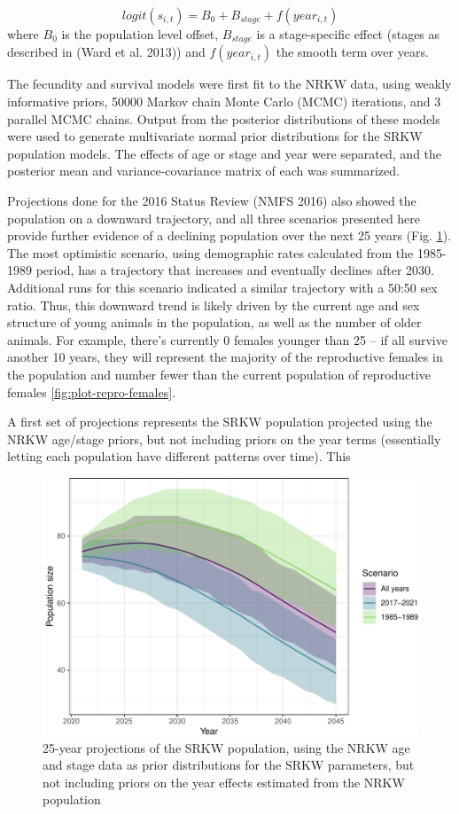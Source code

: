 \documentclass[]{article}
\begin{document}
\[logit(s_{i,t})=B_{0} + B_{stage} + f(year_{i,t})\] where \(B_{0}\) is
the population level offset, \(B_{stage}\) is a stage-specific effect
(stages as described in (Ward et al. 2013)) and \(f(year_{i,t})\) the
smooth term over years.

The fecundity and survival models were first fit to the NRKW data, using
weakly informative priors, 50000 Markov chain Monte Carlo (MCMC)
iterations, and 3 parallel MCMC chains. Output from the posterior
distributions of these models were used to generate multivariate normal
prior distributions for the SRKW population models. The effects of age
or stage and year were separated, and the posterior mean and
variance-covariance matrix of each was summarized.

Projections done for the 2016 Status Review (NMFS 2016) also showed the
population on a downward trajectory, and all three scenarios presented
here provide further evidence of a declining population over the next 25
years (Fig. \ref{fig:proj1}). The most optimistic scenario, using
demographic rates calculated from the 1985-1989 period, has a trajectory
that increases and eventually declines after 2030. Additional runs for
this scenario indicated a similar trajectory with a 50:50 sex ratio.
Thus, this downward trend is likely driven by the current age and sex
structure of young animals in the population, as well as the number of
older animals. For example, there's currently 0 females younger than 25
-- if all survive another 10 years, they will represent the majority of
the reproductive females in the population and number fewer than the
current population of reproductive females \ref{fig:plot-repro-females}.

A first set of projections represents the SRKW population projected
using the NRKW age/stage priors, but not including priors on the year
terms (essentially letting each population have different patterns over
time). This

\begin{figure}
\centering
\includegraphics{status_update_files/figure-latex/proj1-1.pdf}
\caption{25-year projections of the SRKW population, using the NRKW age
and stage data as prior distributions for the SRKW parameters, but not
including priors on the year effects estimated from the NRKW population
\label{fig:proj1}}
\end{figure}
\end{document}
